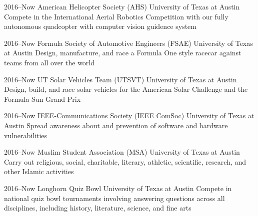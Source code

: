 \documentclass[]{friggeri-cv} %
\begin{document}
\begin{entrylist}

	\entry
	{2016--Now}
	{American Helicopter Society (AHS)}
	{University of Texas at Austin}
	{Compete in the International Aerial Robotics Competition with our fully autonomous quadcopter with computer vision guidence system}


	\entry
	{2016--Now}
	{Formula Society of Automotive Engineers (FSAE)}
	{University of Texas at Austin}
	{Design, manufacture, and race a Formula One style racecar against teams from all over the world}


	\entry
	{2016--Now}
	{UT Solar Vehicles Team (UTSVT)}
	{University of Texas at Austin}
	{Design, build, and race solar vehicles for the American Solar Challenge and the Formula Sun Grand Prix}


	\entry
	{2016--Now}
	{IEEE-Communications Society (IEEE ComSoc)}
	{University of Texas at Austin}
	{Spread awareness about and prevention of software and hardware vulnerabilities}


	\entry
	{2016--Now}
	{Muslim Student Association (MSA)}
	{University of Texas at Austin}
	{Carry out religious, social, charitable, literary, athletic, scientific, research, and other Islamic activities}


	\entry
	{2016--Now}
	{Longhorn Quiz Bowl}
	{University of Texas at Austin}
	{Compete in national quiz bowl tournaments involving answering questions across all disciplines, including history, literature, science, and fine arts}






\end{entrylist}
\end{document}
